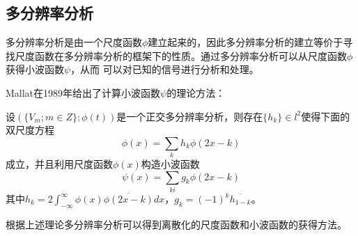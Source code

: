 \subsection{多分辨率分析}
多分辨率分析是由一个尺度函数$\phi$建立起来的，因此多分辨率分析的建立等价于寻找尺度函数在多分辨率分析的框架下的性质。通过多分辨率分析可以从尺度函数$\phi$获得小波函数$\psi$，从而
可以对已知的信号进行分析和处理。
\par  Mallat在1989年给出了计算小波函数$\psi$的理论方法：
\par 设$(\{ V_{m};m\in Z\} ;\phi(t))$是一个正交多分辨率分析，则存在$\{ h_{k} \}\in l^{2}$使得下面的双尺度方程
\begin{equation}
	\phi(x) = \sum_{k}h_{k}\phi(2x-k)
\end{equation}
成立，并且利用尺度函数$\phi(x)$构造小波函数
\begin{equation}
	\psi(x)=\sum_{ki}g_{k}\phi(2x-k)
\end{equation}
其中$h_{k}=2\int_{-\infty}^{\infty}\phi(x)\overline{\phi(2x-k)}dx$，$g_{k}=(-1)^{k}\overline{h_{1-k}}$。
\par 根据上述理论多分辨率分析可以得到离散化的尺度函数和小波函数的获得方法。
